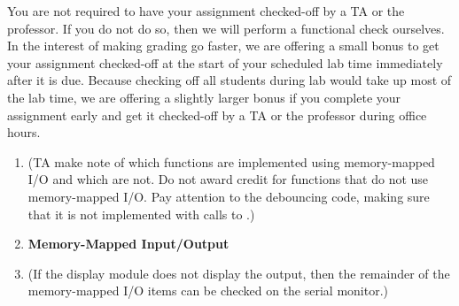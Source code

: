 You are not required to have your assignment checked-off by a TA or the
professor. If you do not do so, then we will perform a functional check
ourselves. In the interest of making grading go faster, we are offering a small
bonus to get your assignment checked-off at the start of your scheduled lab
time immediately after it is due. Because checking off all students during lab
would take up most of the lab time, we are offering a slightly larger bonus if
you complete your assignment early and get it checked-off by a TA or the
professor during office hours.

\begin{enumerate}
    \begin{itemize}
    \item If you are getting checked-off during lab time, show the TA that the
        file was submitted before it was due.
    \item Download the file into your number\_builder directory. If necessary,
        rename it to \textit{number\_builder.ino}.
    \end{itemize}
\item [] (TA make note of which functions are implemented using memory-mapped I/O and which are not. Do not award credit for functions that do not use memory-mapped I/O. Pay attention to the debouncing code, making sure that it is not implemented with calls to .)
\item [] \textbf{Memory-Mapped Input/Output}
\item [] (If the display module does not display the output, then the remainder of the memory-mapped I/O items can be checked on the serial monitor.)

\end{enumerate}
